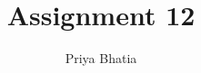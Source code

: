 \documentclass[journal,12pt,twocolumn]{IEEEtran}
\begin{document}
\makeatletter
{}
\makeatother
\let\StandardTheFigure\thefigure
\let\vec\mathbf
\renewcommand{\thefigure}{\theproblem}
\def\putbox#1#2#3{\makebox[0in][l]{\makebox[#1][l]{}\raisebox{\baselineskip}[0in][0in]{\raisebox{#2}[0in][0in]{#3}}}}
     \def\rightbox#1{\makebox[0in][r]{#1}}
     \def\centbox#1{\makebox[0in]{#1}}
     \def\topbox#1{\raisebox{-\baselineskip}[0in][0in]{#1}}
     \def\midbox#1{\raisebox{-0.5\baselineskip}[0in][0in]{#1}}
\vspace{3cm}
\title{Assignment 12}
\author{Priya Bhatia}
%
%
%
% 
%
\end{document}
